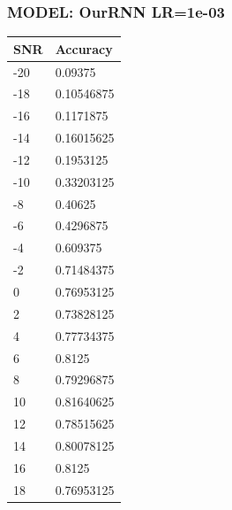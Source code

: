 \documentclass[12pt,a4paper]{article}
\begin{document}
    \subsubsection{MODEL: OurRNN LR=1e-03}
    \begin{table}[!ht]
    \raggedright
    \begin{tabular}{|l|l|}
    \hline
        SNR & Accuracy \\ \hline
        -20 & 0.09375 \\ \hline
        -18 & 0.10546875 \\ \hline
        -16 & 0.1171875 \\ \hline
        -14 & 0.16015625 \\ \hline
        -12 & 0.1953125 \\ \hline
        -10 & 0.33203125 \\ \hline
        -8 & 0.40625 \\ \hline
        -6 & 0.4296875 \\ \hline
        -4 & 0.609375 \\ \hline
        -2 & 0.71484375 \\ \hline
        0 & 0.76953125 \\ \hline
        2 & 0.73828125 \\ \hline
        4 & 0.77734375 \\ \hline
        6 & 0.8125 \\ \hline
        8 & 0.79296875 \\ \hline
        10 & 0.81640625 \\ \hline
        12 & 0.78515625 \\ \hline
        14 & 0.80078125 \\ \hline
        16 & 0.8125 \\ \hline
        18 & 0.76953125 \\ \hline
    \end{tabular}
\end{table}
\newpage
\end{document}
